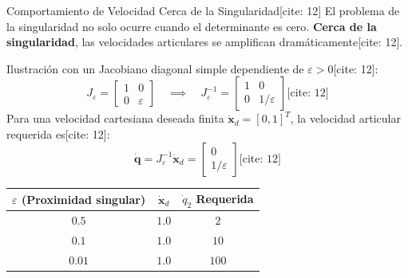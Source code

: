 \documentclass[aspectratio=169, xcolor={table,xcdraw}]{beamer}
\begin{document}
\begin{frame}{Comportamiento de Velocidad Cerca de la Singularidad[cite: 12]}
    El problema de la singularidad no solo ocurre cuando el determinante es cero. \textbf{Cerca de la singularidad}, las velocidades articulares se amplifican dramáticamente[cite: 12].
    
    Ilustración con un Jacobiano diagonal simple dependiente de $\varepsilon > 0$[cite: 12]:
    \begin{equation*}
        J_\varepsilon = \begin{bmatrix} 1 & 0 \\ 0 & \varepsilon \end{bmatrix} \quad \implies \quad J_\varepsilon^{-1} = \begin{bmatrix} 1 & 0 \\ 0 & 1/\varepsilon \end{bmatrix} \text{[cite: 12]}
    \end{equation*}
    Para una velocidad cartesiana deseada finita $\dot{\mathbf{x}}_d = [0, 1]^T$, la velocidad articular requerida es[cite: 12]:
    \begin{equation*}
        \dot{\mathbf{q}} = J_\varepsilon^{-1} \dot{\mathbf{x}}_d = \begin{bmatrix} 0 \\ 1/\varepsilon \end{bmatrix} \text{[cite: 12]}
    \end{equation*}

    \begin{center}
        \begin{tabular}{ccc}
        \toprule
        $\varepsilon$ (Proximidad singular) & $\dot{\mathbf{x}}_d$ & $\dot{q}_2$ Requerida \\ \midrule
        $0.5$ & $1.0$ & $2$ \\
        $0.1$ & $1.0$ & $10$ \\
        $0.01$ & $1.0$ & $100$ \\ \bottomrule
        \end{tabular}
    \end{center}
\end{frame}
\end{document}
